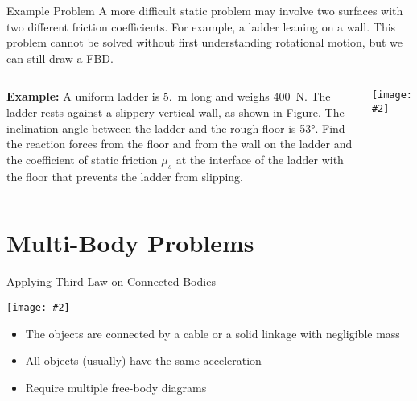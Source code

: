 \documentclass[12pt,compress,aspectratio=169]{beamer}
\newcommand{\pic}[2]{\texttt{[image: \#2]}}
\begin{document}
\begin{frame}{Example Problem}
  A more difficult static problem may involve two surfaces with two different
  friction coefficients. For example, a ladder leaning on a wall. This problem
  cannot be solved without first understanding rotational motion, but we can
  still draw a FBD.
  \vspace{.2in}
  \begin{columns}
    \textbf{Example:} A uniform ladder is \SI{5.}{\metre} long and weighs
    \SI{400}{\newton}. The ladder rests against a slippery vertical wall, as
    shown in Figure. The inclination angle between the ladder and the rough
    floor is \ang{53}. Find the reaction forces from the floor and
    from the wall on the ladder and the coefficient of static friction $\mu_s$
    at the interface of the ladder with the floor that prevents the ladder from
    slipping.

    \pic{1}{graphics/ladder}
  \end{columns}
\end{frame}



\section{Multi-Body Problems}

\begin{frame}{Applying Third Law on Connected Bodies}
  \begin{center}
    \pic{.7}{graphics/worldslongestroadtrainwithpowertrailer8}
  \end{center}
  \begin{itemize}
  \item The objects are connected by a cable or a solid linkage with negligible
    mass
  \item All objects (usually) have the same acceleration
  \item Require multiple free-body diagrams
  \end{itemize}
\end{frame}
\end{document}

